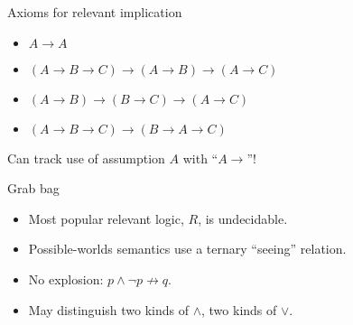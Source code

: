 \documentclass{beamer}
\begin{document}
\begin{frame}{Axioms for relevant implication}
\begin{itemize}
\item $A\to A$
\item $(A\to B\to C)\to (A\to B)\to (A\to C)$
\item $(A\to B)\to (B\to C)\to (A\to C)$
\item $(A\to B\to C)\to (B\to A\to C)$
\end{itemize}
\vfill
Can track use of assumption $A$ with ``$A\to$''!
\end{frame}

\begin{frame}{Grab bag}
\begin{itemize}
\item Most popular relevant logic, $R$, is undecidable.
\item Possible-worlds semantics use a ternary ``seeing'' relation.
\item No explosion: $p\land\lnot p\not\to q$.
\item May distinguish two kinds of $\land$, two kinds of $\lor$.
\end{itemize}
\end{frame}
\end{document}
